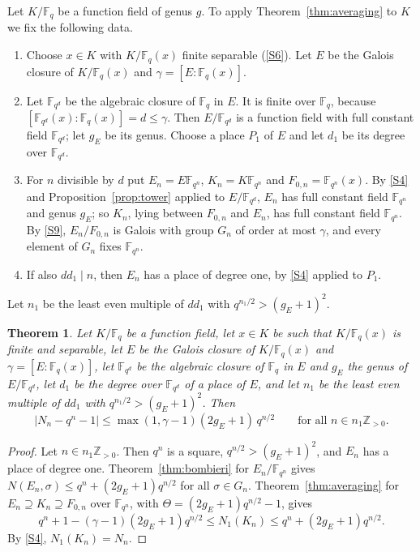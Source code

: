 \documentclass[11pt]{amsbook}
\theoremstyle{plain}
\newtheorem{theorem}{Theorem}[section]
\theoremstyle{definition}
\theoremstyle{remark}
\numberwithin{equation}{section}
\numberwithin{figure}{chapter}
\numberwithin{table}{chapter}
\newcommand{\Z}{\mathbb{Z}}
\newcommand{\F}{\mathbb{F}}
\begin{document}
Let $K/\F_q$ be a function field of genus $g$. To apply
Theorem~\ref{thm:averaging} to $K$ we fix the following data.
\begin{enumerate}
\item Choose $x\in K$ with $K/\F_q(x)$ finite separable (\ref{S6}).
Let $E$ be the Galois closure of $K/\F_q(x)$ and
$\gamma=[E:\F_q(x)]$.
\item Let $\F_{q^d}$ be the algebraic closure of $\F_q$ in $E$. It
is finite over $\F_q$, because
$[\F_{q^d}(x):\F_q(x)]=d\le\gamma$. Then $E/\F_{q^d}$ is a function
field with full constant field $\F_{q^d}$; let $g_E$ be its genus.
Choose a place $P_1$ of $E$ and let $d_1$ be its degree over
$\F_{q^d}$.
\item For $n$ divisible by $d$ put $E_n=E\F_{q^n}$,
$K_n=K\F_{q^n}$ and $F_{0,n}=\F_{q^n}(x)$. By \ref{S4} and
Proposition~\ref{prop:tower} applied to $E/\F_{q^d}$, $E_n$ has full
constant field $\F_{q^n}$ and genus $g_E$; so $K_n$, lying between
$F_{0,n}$ and $E_n$, has full constant field $\F_{q^n}$. By
\ref{S9}, $E_n/F_{0,n}$ is Galois with group $G_n$ of order at most
$\gamma$, and every element of $G_n$ fixes $\F_{q^n}$.
\item If also $dd_1\mid n$, then $E_n$ has a place of degree one,
by \ref{S4} applied to $P_1$.
\end{enumerate}
Let $n_1$ be the least even multiple of $dd_1$ with
$q^{n_1/2}>(g_E+1)^2$.

\begin{theorem}\label{thm:two-sided}
Let $K/\F_q$ be a function field, let $x\in K$ be such that
$K/\F_q(x)$ is finite and separable, let $E$ be the Galois closure
of $K/\F_q(x)$ and $\gamma=[E:\F_q(x)]$, let $\F_{q^d}$ be the
algebraic closure of $\F_q$ in $E$ and $g_E$ the genus of
$E/\F_{q^d}$, let $d_1$ be the degree over $\F_{q^d}$ of a place of
$E$, and let $n_1$ be the least even multiple of $dd_1$ with
$q^{n_1/2}>(g_E+1)^2$. Then
\begin{equation}\label{eq:two-sided}
\lvert N_n-q^n-1\rvert\le\max(1,\gamma-1)(2g_E+1)\,q^{n/2}
\qquad\text{for all }n\in n_1\Z_{>0}.
\end{equation}
\end{theorem}

\begin{proof}
Let $n\in n_1\Z_{>0}$. Then $q^n$ is a square,
$q^{n/2}>(g_E+1)^2$, and $E_n$ has a place of degree one.
Theorem~\ref{thm:bombieri} for $E_n/\F_{q^n}$ gives
$N(E_n,\sigma)\le q^n+(2g_E+1)q^{n/2}$ for all $\sigma\in G_n$.
Theorem~\ref{thm:averaging} for
$E_n\supseteq K_n\supseteq F_{0,n}$ over $\F_{q^n}$, with
$\Theta=(2g_E+1)q^{n/2}-1$, gives
\[
q^n+1-(\gamma-1)(2g_E+1)q^{n/2}\le N_1(K_n)
\le q^n+(2g_E+1)q^{n/2}.
\]
By \ref{S4}, $N_1(K_n)=N_n$.
\end{proof}
\end{document}
